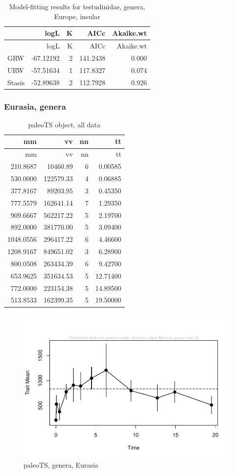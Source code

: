 \documentclass[]{article}
\begin{document}
\begin{longtable}[]{@{}lrrrr@{}}
\caption{Model-fitting results for testudinidae, genera, Europe,
insular}\tabularnewline
\toprule
& logL & K & AICc & Akaike.wt\tabularnewline
\midrule
\endfirsthead
\toprule
& logL & K & AICc & Akaike.wt\tabularnewline
\midrule
\endhead
GRW & -67.12192 & 2 & 141.2438 & 0.000\tabularnewline
URW & -57.51634 & 1 & 117.8327 & 0.074\tabularnewline
Stasis & -52.89638 & 2 & 112.7928 & 0.926\tabularnewline
\bottomrule
\end{longtable}

\newpage 

\subsubsection{Eurasia, genera}\label{eurasia-genera}

\begin{longtable}[]{@{}rrrr@{}}
\caption{paleoTS object, all data}\tabularnewline
\toprule
mm & vv & nn & tt\tabularnewline
\midrule
\endfirsthead
\toprule
mm & vv & nn & tt\tabularnewline
\midrule
\endhead
210.8687 & 10460.89 & 6 & 0.00585\tabularnewline
530.0000 & 122579.33 & 4 & 0.06885\tabularnewline
377.8167 & 89203.95 & 3 & 0.45350\tabularnewline
777.5579 & 162641.14 & 7 & 1.29350\tabularnewline
909.6667 & 562217.22 & 5 & 2.19700\tabularnewline
892.0000 & 381770.00 & 5 & 3.09400\tabularnewline
1048.0556 & 296417.22 & 6 & 4.46600\tabularnewline
1208.9167 & 849651.02 & 3 & 6.28900\tabularnewline
800.0508 & 263434.39 & 6 & 9.42700\tabularnewline
653.9625 & 351634.53 & 5 & 12.71400\tabularnewline
772.0000 & 223154.38 & 5 & 14.89500\tabularnewline
513.8533 & 162399.35 & 5 & 19.50000\tabularnewline
\bottomrule
\end{longtable}

\begin{figure}[htbp]
\centering
\includegraphics{MA_JJ_files/figure-latex/paleoTSEurasia-1.pdf}
\caption{paleoTS, genera, Eurasia}
\end{figure}
\end{document}
